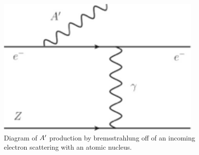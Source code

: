 \begin{figure}
\includegraphics[scale=1]{measurements/Aprime-diagram.pdf}
\caption{Diagram of  $A^\prime$ production by bremsstrahlung off of an incoming electron scattering with an atomic nucleus.}
\label{fig:apdiagram}
\end{figure}

